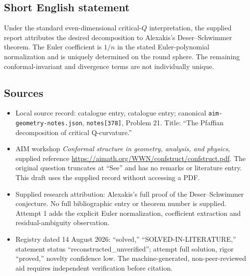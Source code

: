 \documentclass[11pt]{article}
\begin{document}
\subsection{Short English statement}
Under the standard even-dimensional critical-\(Q\) interpretation, the supplied report attributes the desired decomposition to Alexakis's Deser--Schwimmer theorem. The Euler coefficient is \(1/n\) in the stated Euler-polynomial normalization and is uniquely determined on the round sphere. The remaining conformal-invariant and divergence terms are not individually unique.
\subsection{Sources}
\begin{itemize}
\item Local source record: catalogue entry, catalogue entry; canonical \texttt{aim-geometry-notes.json}, \texttt{notes[378]}, Problem 21. Title: ``The Pfaffian decomposition of critical Q-curvature.''
\item AIM workshop \emph{Conformal structure in geometry, analysis, and physics}, supplied reference \url{https://aimath.org/WWN/confstruct/confstruct.pdf}. The original question truncates at ``See'' and has no remarks or literature entry. This draft uses the supplied record without accessing a PDF.
\item Supplied research attribution: Alexakis's full proof of the Deser--Schwimmer conjecture. No full bibliographic entry or theorem number is supplied. Attempt 1 adds the explicit Euler normalization, coefficient extraction and residual-ambiguity observation.
\item Registry dated 14 August 2026: ``solved,'' ``SOLVED-IN-LITERATURE,'' statement status ``reconstructed\_unverified''; attempt full solution, rigor ``proved,'' novelty confidence low. The machine-generated, non-peer-reviewed aid requires independent verification before citation.
\end{itemize}
\end{document}
